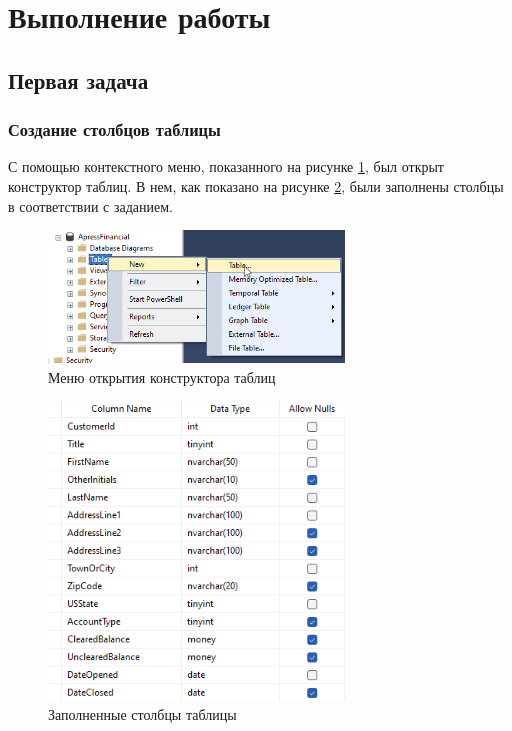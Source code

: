\documentclass[a4paper, 14pt]{extarticle}
\begin{document}
\section{Выполнение работы}

\subsection{Первая задача}

\subsubsection{Создание столбцов таблицы}

С помощью контекстного меню, показанного на рисунке \ref{fig:task-1-1}, был
открыт конструктор таблиц. В нем, как показано на рисунке \ref{fig:task-1-2},
были заполнены столбцы в соответствии с заданием.

\begin{figure}[H]
  \centering
  \includegraphics[width=0.7\textwidth]{images/task-1/1.png}
  \caption{Меню открытия конструктора таблиц}
  \label{fig:task-1-1}
\end{figure}

\begin{figure}[H]
  \centering
  \includegraphics[width=0.7\textwidth]{images/task-1/2.png}
  \caption{Заполненные столбцы таблицы}
  \label{fig:task-1-2}
\end{figure}
\end{document}
